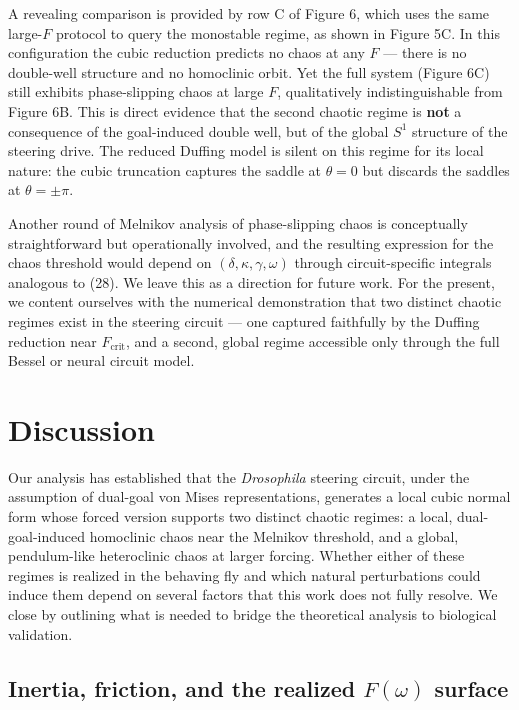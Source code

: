\documentclass[11pt]{article}
\begin{document}
A revealing comparison is provided by row C of Figure 6, which uses the same large-$F$ protocol to query the monostable regime, as shown in Figure 5C. In this configuration the cubic reduction predicts no chaos at any $F$ --- there is no double-well structure and no homoclinic orbit. Yet the full system (Figure 6C) still exhibits phase-slipping chaos at large $F$, qualitatively indistinguishable from Figure 6B. This is direct evidence that the second chaotic regime is \textbf{not} a consequence of the goal-induced double well, but of the global $S^1$ structure of the steering drive. The reduced Duffing model is silent on this regime for its local nature: the cubic truncation captures the saddle at $\theta = 0$ but discards the saddles at $\theta = \pm\pi$.

Another round of Melnikov analysis of phase-slipping chaos is conceptually straightforward but operationally involved, and the resulting expression for the chaos threshold would depend on $(\delta, \kappa, \gamma, \omega)$ through circuit-specific integrals analogous to (28). We leave this as a direction for future work. For the present, we content ourselves with the numerical demonstration that two distinct chaotic regimes exist in the steering circuit --- one captured faithfully by the Duffing reduction near $F_{\text{crit}}$, and a second, global regime accessible only through the full Bessel or neural circuit model.

\section{Discussion}

Our analysis has established that the \textit{Drosophila} steering circuit, under the assumption of dual-goal von Mises representations, generates a local cubic normal form whose forced version supports two distinct chaotic regimes: a local, dual-goal-induced homoclinic chaos near the Melnikov threshold, and a global, pendulum-like heteroclinic chaos at larger forcing. Whether either of these regimes is realized in the behaving fly and which natural perturbations could induce them depend on several factors that this work does not fully resolve. We close by outlining what is needed to bridge the theoretical analysis to biological validation.

\subsection{Inertia, friction, and the realized $F(\omega)$ surface}
\end{document}
